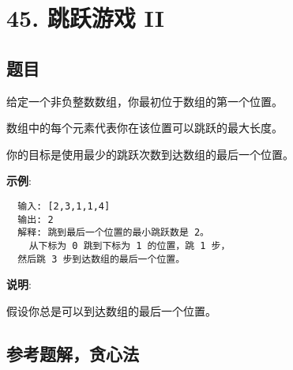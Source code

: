 \newpage
\section{45. 跳跃游戏 II}
\label{leetcode:45}

\subsection{题目}

给定一个非负整数数组，你最初位于数组的第一个位置。

数组中的每个元素代表你在该位置可以跳跃的最大长度。

你的目标是使用最少的跳跃次数到达数组的最后一个位置。

\textbf{示例}:

\begin{verbatim}
  输入: [2,3,1,1,4]
  输出: 2
  解释: 跳到最后一个位置的最小跳跃数是 2。
    从下标为 0 跳到下标为 1 的位置，跳 1 步，
  然后跳 3 步到达数组的最后一个位置。
\end{verbatim}

\textbf{说明}:

假设你总是可以到达数组的最后一个位置。

\subsection{参考题解，贪心法}
